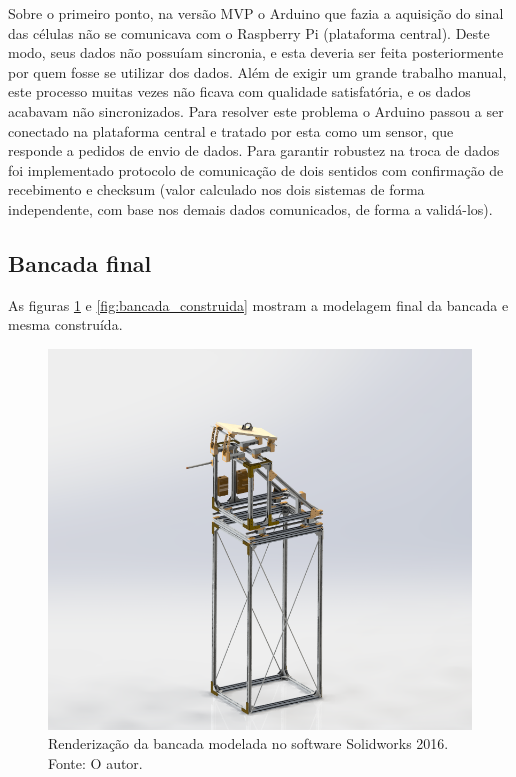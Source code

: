 Sobre o primeiro ponto, na versão MVP o Arduino que fazia a aquisição do sinal das células não se comunicava com o Raspberry Pi (plataforma central). Deste modo, seus dados não possuíam sincronia, e esta deveria ser feita posteriormente por quem fosse se utilizar dos dados. Além de exigir um grande trabalho manual, este processo muitas vezes não ficava com qualidade satisfatória, e os dados acabavam não sincronizados. Para resolver este problema o Arduino passou a ser conectado na plataforma central e tratado por esta como um sensor, que responde a pedidos de envio de dados. Para garantir robustez na troca de dados foi implementado protocolo de comunicação de dois sentidos com confirmação de recebimento e checksum (valor calculado nos dois sistemas de forma independente, com base nos demais dados comunicados, de forma a validá-los).

\subsection{Bancada final}

As figuras \ref{fig:render_bancada_completa} e \ref{fig:bancada_construida} mostram a modelagem final da bancada e mesma construída.

\begin{figure}[!ht]
    \centering
    \includegraphics[width=.8\linewidth]{figuras/renders/perspectiva_sem_asa_com_pitot.png}
    \caption{Renderização da bancada modelada no software Solidworks 2016. Fonte: O autor.}
    \label{fig:render_bancada_completa}
\end{figure}


